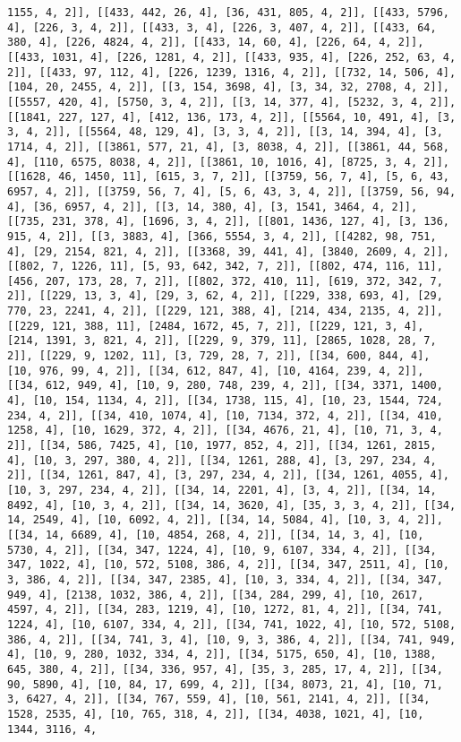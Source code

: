 \documentclass[12pt,fleqn]{article}\usepackage{../../common}
\begin{document}
\begin{verbatim}
1155, 4, 2]], [[433, 442, 26, 4], [36, 431, 805, 4, 2]], [[433, 5796, 4], [226, 3, 4, 2]], [[433, 3, 4], [226, 3, 407, 4, 2]], [[433, 64, 380, 4], [226, 4824, 4, 2]], [[433, 14, 60, 4], [226, 64, 4, 2]], [[433, 1031, 4], [226, 1281, 4, 2]], [[433, 935, 4], [226, 252, 63, 4, 2]], [[433, 97, 112, 4], [226, 1239, 1316, 4, 2]], [[732, 14, 506, 4], [104, 20, 2455, 4, 2]], [[3, 154, 3698, 4], [3, 34, 32, 2708, 4, 2]], [[5557, 420, 4], [5750, 3, 4, 2]], [[3, 14, 377, 4], [5232, 3, 4, 2]], [[1841, 227, 127, 4], [412, 136, 173, 4, 2]], [[5564, 10, 491, 4], [3, 3, 4, 2]], [[5564, 48, 129, 4], [3, 3, 4, 2]], [[3, 14, 394, 4], [3, 1714, 4, 2]], [[3861, 577, 21, 4], [3, 8038, 4, 2]], [[3861, 44, 568, 4], [110, 6575, 8038, 4, 2]], [[3861, 10, 1016, 4], [8725, 3, 4, 2]], [[1628, 46, 1450, 11], [615, 3, 7, 2]], [[3759, 56, 7, 4], [5, 6, 43, 6957, 4, 2]], [[3759, 56, 7, 4], [5, 6, 43, 3, 4, 2]], [[3759, 56, 94, 4], [36, 6957, 4, 2]], [[3, 14, 380, 4], [3, 1541, 3464, 4, 2]], [[735, 231, 378, 4], [1696, 3, 4, 2]], [[801, 1436, 127, 4], [3, 136, 915, 4, 2]], [[3, 3883, 4], [366, 5554, 3, 4, 2]], [[4282, 98, 751, 4], [29, 2154, 821, 4, 2]], [[3368, 39, 441, 4], [3840, 2609, 4, 2]], [[802, 7, 1226, 11], [5, 93, 642, 342, 7, 2]], [[802, 474, 116, 11], [456, 207, 173, 28, 7, 2]], [[802, 372, 410, 11], [619, 372, 342, 7, 2]], [[229, 13, 3, 4], [29, 3, 62, 4, 2]], [[229, 338, 693, 4], [29, 770, 23, 2241, 4, 2]], [[229, 121, 388, 4], [214, 434, 2135, 4, 2]], [[229, 121, 388, 11], [2484, 1672, 45, 7, 2]], [[229, 121, 3, 4], [214, 1391, 3, 821, 4, 2]], [[229, 9, 379, 11], [2865, 1028, 28, 7, 2]], [[229, 9, 1202, 11], [3, 729, 28, 7, 2]], [[34, 600, 844, 4], [10, 976, 99, 4, 2]], [[34, 612, 847, 4], [10, 4164, 239, 4, 2]], [[34, 612, 949, 4], [10, 9, 280, 748, 239, 4, 2]], [[34, 3371, 1400, 4], [10, 154, 1134, 4, 2]], [[34, 1738, 115, 4], [10, 23, 1544, 724, 234, 4, 2]], [[34, 410, 1074, 4], [10, 7134, 372, 4, 2]], [[34, 410, 1258, 4], [10, 1629, 372, 4, 2]], [[34, 4676, 21, 4], [10, 71, 3, 4, 2]], [[34, 586, 7425, 4], [10, 1977, 852, 4, 2]], [[34, 1261, 2815, 4], [10, 3, 297, 380, 4, 2]], [[34, 1261, 288, 4], [3, 297, 234, 4, 2]], [[34, 1261, 847, 4], [3, 297, 234, 4, 2]], [[34, 1261, 4055, 4], [10, 3, 297, 234, 4, 2]], [[34, 14, 2201, 4], [3, 4, 2]], [[34, 14, 8492, 4], [10, 3, 4, 2]], [[34, 14, 3620, 4], [35, 3, 3, 4, 2]], [[34, 14, 2549, 4], [10, 6092, 4, 2]], [[34, 14, 5084, 4], [10, 3, 4, 2]], [[34, 14, 6689, 4], [10, 4854, 268, 4, 2]], [[34, 14, 3, 4], [10, 5730, 4, 2]], [[34, 347, 1224, 4], [10, 9, 6107, 334, 4, 2]], [[34, 347, 1022, 4], [10, 572, 5108, 386, 4, 2]], [[34, 347, 2511, 4], [10, 3, 386, 4, 2]], [[34, 347, 2385, 4], [10, 3, 334, 4, 2]], [[34, 347, 949, 4], [2138, 1032, 386, 4, 2]], [[34, 284, 299, 4], [10, 2617, 4597, 4, 2]], [[34, 283, 1219, 4], [10, 1272, 81, 4, 2]], [[34, 741, 1224, 4], [10, 6107, 334, 4, 2]], [[34, 741, 1022, 4], [10, 572, 5108, 386, 4, 2]], [[34, 741, 3, 4], [10, 9, 3, 386, 4, 2]], [[34, 741, 949, 4], [10, 9, 280, 1032, 334, 4, 2]], [[34, 5175, 650, 4], [10, 1388, 645, 380, 4, 2]], [[34, 336, 957, 4], [35, 3, 285, 17, 4, 2]], [[34, 90, 5890, 4], [10, 84, 17, 699, 4, 2]], [[34, 8073, 21, 4], [10, 71, 3, 6427, 4, 2]], [[34, 767, 559, 4], [10, 561, 2141, 4, 2]], [[34, 1528, 2535, 4], [10, 765, 318, 4, 2]], [[34, 4038, 1021, 4], [10, 1344, 3116, 4, 
\end{verbatim}
\end{document}
